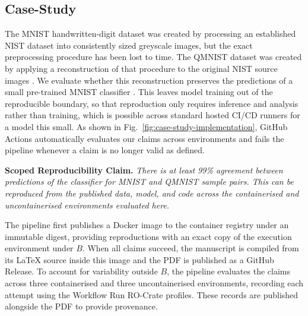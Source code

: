 \documentclass[conference,a4paper]{IEEEtran}
\newlength{\PaperStrokeWidth}
\begin{document}
\subsection{Case-Study}
\label{sec:case-study}
\begin{figure}[!b]
  \CaseStudyImplementationFigure{\PaperStrokeWidth}{0.95cm}
\end{figure}

The MNIST handwritten-digit dataset was created by processing an established NIST dataset into consistently sized greyscale images, but the exact preprocessing procedure has been lost to time. The QMNIST dataset was created by applying a reconstruction of that procedure to the original NIST source images \cite{yadav2019qmnist}. We evaluate whether this reconstruction preserves the predictions of a small pre-trained MNIST classifier \cite{onnxmodelzoo2022mnist12}. This leaves model training out of the reproducible boundary, so that reproduction only requires inference and analysis rather than training, which is possible across standard hosted CI/CD runners for a model this small. As shown in Fig.~\ref{fig:case-study-implementation}, GitHub Actions automatically evaluates our claims across environments and fails the pipeline whenever a claim is no longer valid as defined. 

\vspace*{2mm}
\begin{statementbox}
  \textbf{Scoped Reproducibility Claim.}\quad
  \textsl{There is at least 99\% agreement between predictions of the classifier for MNIST and QMNIST sample pairs. This can be reproduced from the published data, model, and code across the containerised and uncontainerised environments evaluated here.}
\end{statementbox}
\vspace*{2mm}

The pipeline first publishes a Docker image to the container registry under an immutable digest, providing reproductions with an exact copy of the execution environment under $B$. When all claims succeed, the manuscript is compiled from its \LaTeX{} source inside this image and the PDF is published as a GitHub Release. To account for variability outside $B$, the pipeline evaluates the claims across three containerised and three uncontainerised environments, recording each attempt using the Workflow Run RO-Crate profiles. These records are published alongside the PDF to provide provenance. 

\end{document}
